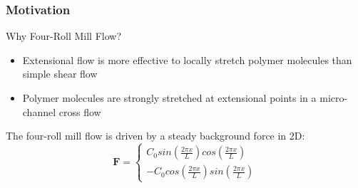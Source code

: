 \begin{frame}
  \frametitle{Motivation}
  \begin{block}{Why Four-Roll Mill Flow?}
    \begin{itemize}
    \item Extensional flow is more effective to locally 
      stretch polymer molecules than simple shear flow
    \item Polymer molecules are strongly stretched at extensional points in a micro-channel cross flow
    \end{itemize}
  \end{block}
  The four-roll mill flow is driven by a steady background force in 2D:
  \begin{equation}
    \mathbf{F}=\left\{\begin{matrix}
        C_0sin(\frac{2\pi x} {L})cos(\frac{2\pi x} {L})
        \\ 
        -C_0cos(\frac{2\pi x} {L})sin(\frac{2\pi x} {L})
      \end{matrix}\right.
  \end{equation}
\end{frame}



